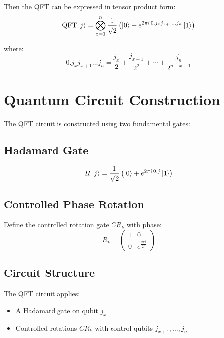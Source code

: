 \documentclass[conference]{IEEEtran}
\begin{document}
Then the QFT can be expressed in tensor product form:
\begin{equation}
\mathrm{QFT}\ket{j}
= \bigotimes_{x=1}^{n}
\frac{1}{\sqrt{2}}
\left(
\ket{0} + e^{2\pi i \, 0.j_x j_{x+1} \dots j_n} \ket{1}
\right)\label{eq:equation4}
\end{equation}

where:
\begin{equation}
0.j_x j_{x+1}\dots j_n =
\frac{j_x}{2} + \frac{j_{x+1}}{2^2} + \cdots + \frac{j_n}{2^{n-x+1}}\label{eq:equation5}
\end{equation}

\section{Quantum Circuit Construction}\label{sec:quantum-circuit-construction}

The QFT circuit is constructed using two fundamental gates:

\subsection{Hadamard Gate}\label{subsec:hadamard-gate}

\begin{equation}
H\ket{j} =
\frac{1}{\sqrt{2}}
\left(
\ket{0} + e^{2\pi i \, 0.j} \ket{1}
\right)\label{eq:equation6}
\end{equation}

\subsection{Controlled Phase Rotation}\label{subsec:controlled-phase-rotation}

Define the controlled rotation gate $CR_k$ with phase:
\begin{equation}
R_k =
\begin{pmatrix}
1 & 0 \\
0 & e^{\frac{2\pi i}{2^k}}
\end{pmatrix}\label{eq:equation7}
\end{equation}

\subsection{Circuit Structure}\label{subsec:circuit-structure}

The QFT circuit applies:

\begin{itemize}
    \item A Hadamard gate on qubit $j_x$
    \item Controlled rotations $CR_k$ with control qubits $j_{x+1}, \dots, j_n$
\end{itemize}
\end{document}
